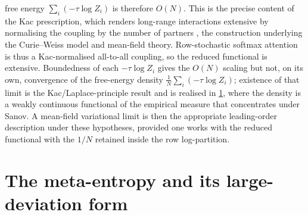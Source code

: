 \documentclass[11pt]{article}
\theoremstyle{plain}
\theoremstyle{definition}
\begin{document}
free energy $\sum_i(-\tau\log Z_i)$ is therefore $O(N)$. This is the precise content of the
Kac prescription, which renders long-range interactions extensive by normalising the
coupling by the number of partners \citep{kac1963vanderwaals}, the construction underlying
the Curie--Weiss model and mean-field theory. Row-stochastic softmax attention is thus a
Kac-normalised all-to-all coupling, so the reduced functional is extensive. Boundedness of
each $-\tau\log Z_i$ gives the $O(N)$ scaling but not, on its own, convergence of the
free-energy density $\frac1N\sum_i(-\tau\log Z_i)$; existence of that limit is the
Kac/Laplace-principle result \citep{kac1963vanderwaals,ellis1985entropy} and is realised
in \cref{sec:meta}, where the density is a weakly continuous functional of the empirical
measure that concentrates under Sanov. A mean-field variational limit is then the
appropriate leading-order description under these hypotheses, provided one works with the
reduced functional with the $1/N$ retained inside the row log-partition.

\section{The meta-entropy and its large-deviation form}
\label{sec:meta}
\end{document}
